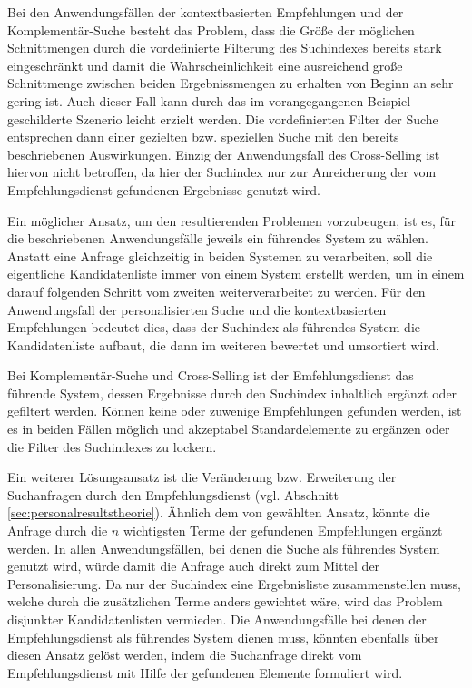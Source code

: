 Bei den Anwendungsfällen der kontextbasierten Empfehlungen und der Komplementär-Suche besteht das Problem, dass die Größe der möglichen Schnittmengen durch die vordefinierte Filterung des Suchindexes bereits stark eingeschränkt und damit die Wahrscheinlichkeit eine ausreichend große Schnittmenge zwischen beiden Ergebnissmengen zu erhalten von Beginn an sehr gering ist. Auch dieser Fall kann durch das im vorangegangenen Beispiel geschilderte Szenerio leicht erzielt werden. Die vordefinierten Filter der Suche entsprechen dann einer gezielten bzw. speziellen Suche mit den bereits beschriebenen Auswirkungen. Einzig der Anwendungsfall des Cross-Selling ist hiervon nicht betroffen, da hier der Suchindex nur zur Anreicherung der vom Empfehlungsdienst gefundenen Ergebnisse genutzt wird.

Ein möglicher Ansatz, um den resultierenden Problemen vorzubeugen, ist es, für die beschriebenen Anwendungsfälle jeweils ein führendes System zu wählen. Anstatt eine Anfrage gleichzeitig in beiden Systemen zu verarbeiten, soll die eigentliche Kandidatenliste immer von einem System erstellt werden, um in einem darauf folgenden Schritt vom zweiten weiterverarbeitet zu werden. Für den Anwendungsfall der personalisierten Suche und die kontextbasierten Empfehlungen bedeutet dies, dass der Suchindex als führendes System die Kandidatenliste aufbaut, die dann im weiteren bewertet und umsortiert wird.

Bei Komplementär-Suche und Cross-Selling ist der Emfehlungsdienst das führende System, dessen Ergebnisse durch den Suchindex inhaltlich ergänzt oder gefiltert werden. Können keine oder zuwenige Empfehlungen gefunden werden, ist es in beiden Fällen möglich und akzeptabel Standardelemente zu ergänzen oder die Filter des Suchindexes zu lockern.

Ein weiterer Lösungsansatz ist die Veränderung bzw. Erweiterung der Suchanfragen durch den Empfehlungsdienst (vgl. Abschnitt \ref{sec:personalresultstheorie}). Ähnlich dem von \citep{Boughareb11} gewählten Ansatz, könnte die Anfrage durch die  $n$ wichtigsten Terme der gefundenen Empfehlungen ergänzt werden. In allen Anwendungsfällen, bei denen die Suche als führendes System genutzt wird, würde damit die Anfrage auch direkt zum Mittel der Personalisierung. Da nur der Suchindex eine Ergebnisliste zusammenstellen muss, welche durch die zusätzlichen Terme anders gewichtet wäre, wird das Problem disjunkter Kandidatenlisten vermieden. Die Anwendungsfälle bei denen der Empfehlungsdienst als führendes System dienen muss, könnten ebenfalls über diesen Ansatz gelöst werden, indem die Suchanfrage direkt vom Empfehlungsdienst mit Hilfe der gefundenen Elemente formuliert wird. \newpage %

